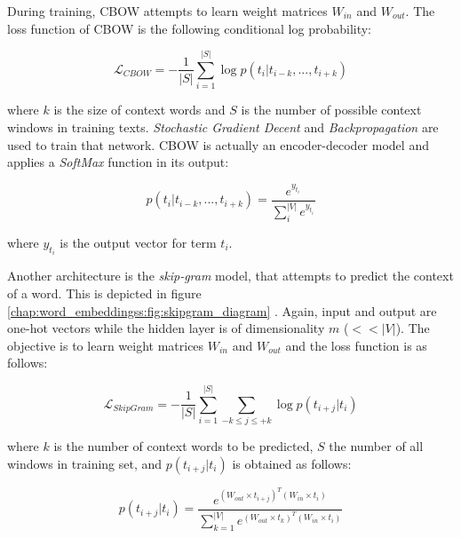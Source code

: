 During training, CBOW attempts to learn weight matrices $W_{in}$ and $W_{out}$. The loss function of CBOW is the following conditional log probability: 

\begin{equation} \label{chap:word_embeddings:eq:CBOW_log_likelihood}
	 \mathcal{L}_{CBOW} = -\frac{1}{|S|} \sum_{i=1}^{|S|}{\log{p(t_{i}|t_{i-k}, ... ,t_{i+k})}}
\end{equation}

\noindent
where $k$ is the size of context words and $S$ is the number of possible context windows in training texts. \textit{Stochastic Gradient Decent} and \textit{Backpropagation} are used to train that network. CBOW is actually an encoder-decoder model and applies a \textit{SoftMax} function in its output:  

\begin{equation} \label{chap:word_embeddings:eq:CBOW_softmax}
	p(t_{i}|t_{i-k},...,t_{i+k}) = \frac{e^{y_{t_{i}}}}{\sum^{|V|}_{i}{e^{y_{t_i}}}}
\end{equation}

\nointdent where $y_{t_i}$ is the output vector for term $t_i$.

Another architecture is the \textit{skip-gram} model, that attempts to predict the context of a word. This is depicted in figure \ref{chap:word_embeddingss:fig:skipgram_diagram} \parencite{mitra2018introduction}. Again, input and output are one-hot vectors while the hidden layer is of dimensionality $m$ ($<<|V|$). The objective is to learn weight matrices $W_{in}$ and $W_{out}$ and the loss function is as follows:

\begin{equation} \label{chap:word_embeddings:eq:skipgram_log_likelihood}
	 \mathcal{L}_{SkipGram} = -\frac{1}{|S|} \sum_{i=1}^{|S|}{ \sum_{-k \leq j \leq +k}{ \log {p(t_{i+j}|t_{i})}  } }
\end{equation}

\noindent where $k$ is the number of context words to be predicted, $S$ the number of all windows in training set, and $p(t_{i+j}|t_{i})$ is obtained as follows:

\begin{equation} \label{chap:word_embeddings:eq:skipgram_softmax}
	p(t_{i+j}|t_{i}) = \frac{ e^{(W_{out}  \times  t_{i+j})^{T} (W_{in} \times  t_{i})}}{\sum^{|V|}_{k=1}{ e^{(W_{out}  \times  t_{k})^{T} (W_{in} \times  t_{i})}}} 
\end{equation}

